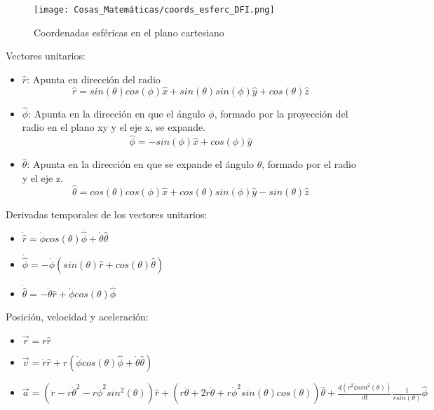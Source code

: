 \begin{figure}[H]
    \centering
    \texttt{[image: Cosas\_Matemáticas/coords\_esferc\_DFI.png]}
    \caption{Coordenadas esféricas en el plano cartesiano}
    \label{fig:C.esfericas}
\end{figure}

Vectores unitarios:

\begin{itemize}
    \item $\hat{r}$: Apunta en dirección del radio
        \[\hat{r} = sin(\theta)cos(\phi)\hat{x} + sin(\theta)sin(\phi)\hat{y} + cos(\theta)\hat{z}\]
    \item $\hat{\phi}$: Apunta en la dirección en que el ángulo $\phi$, formado por la proyección del radio en el plano xy y el eje x, se expande. %
        \[\hat{\phi} = -sin(\phi)\hat{x} + cos(\phi)\hat{y}\]
    \item $\hat{\theta}$: Apunta en la dirección en que se expande el ángulo $\theta$, formado por el radio y el eje z. %
        \[\hat{\theta} = cos(\theta)cos(\phi)\hat{x} + cos(\theta)sin(\phi)\hat{y}-sin(\theta)\hat{z}\]
\end{itemize}

\medbreak

Derivadas temporales de los vectores unitarios:

\begin{itemize}
    \item $\dot{\hat{r}} = \dot{\phi}cos(\theta)\hat{\phi}+\dot{\theta}\hat{\theta}$
    \item $\dot{\hat{\phi}} = -\dot{\phi}(sin(\theta)\hat{r}+cos(\theta)\hat{\theta})$
    \item $\dot{\hat{\theta}} = -\dot{\theta}\hat{r}+\dot{\phi}cos(\theta)\hat{\phi}$
\end{itemize}

\medbreak

Posición, velocidad y aceleración:

\begin{itemize}
    \item $\vec{r} = r\hat{r}$
    \item $\vec{v} = \dot{r}\hat{r} + r(\dot{\phi}cos(\theta)\hat{\phi}+\dot{\theta}\hat{\theta})$
    \item $\vec{a} = (\ddot{r}-r\dot{\theta}^2-r\dot{\phi}^2sin^2(\theta))\hat{r} + (r\ddot{\theta}+2\dot{r}\dot{\theta}+r\dot{\phi}^2sin(\theta)cos(\theta))\hat{\theta} + \frac{d(r^2\dot{\phi}sin^2(\theta))}{dt}\frac{1}{rsin(\theta)}\hat{\phi}$
\end{itemize}

